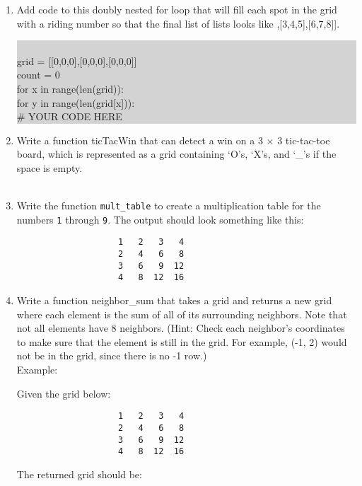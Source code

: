 \documentclass[11pt, letterpaper, onecolumn, oneside, final]{article}
\begin{document}
\begin{enumerate}
\item Add code to this doubly nested for loop that will fill each spot in the grid with a riding number so that the final list of lists looks like {\consolas [[0,1,2],[3,4,5],[6,7,8]]}.
\begin{center}
 \colorbox{lightgray}{\parbox{.9\textwidth}{\consolas\\
grid = [[0,0,0],[0,0,0],[0,0,0]]\\
count = 0\\
for x in range(len(grid)):\\
\hspace*{6mm}for y in range(len(grid[x])):\\
\hspace*{12mm}\# YOUR CODE HERE}}
\end{center}
\vspace*{10mm}
 \item Write a function {\consolas ticTacWin} that can detect a win on a 3 $\times$ 3 tic-tac-toe board, which is represented as a grid containing `O's, `X's, and `\_'s if the space is empty.\\
\\
\newpage
\item Write the function \verb|mult_table| to create a multiplication table for the numbers \verb|1| through \verb|9|. The output should look something like this:
\begin{lstlisting}
                    1   2   3   4  
                    2   4   6   8  
                    3   6   9  12  
                    4   8  12  16
\end{lstlisting}


\item Write a function {\consolas neighbor\_sum} that takes a grid and returns a new grid where each element is the sum of all of its surrounding neighbors. Note that not all elements have 8 neighbors. (Hint: Check each neighbor's coordinates to make sure that the element is still in the grid. For example, (-1, 2) would not be in the grid, since there is no -1 row.)\\
Example:

Given the grid below:
\begin{lstlisting}
                    1   2   3   4  
                    2   4   6   8  
                    3   6   9  12  
                    4   8  12  16
\end{lstlisting}

The returned grid should be:


\end{enumerate}
\end{document}
